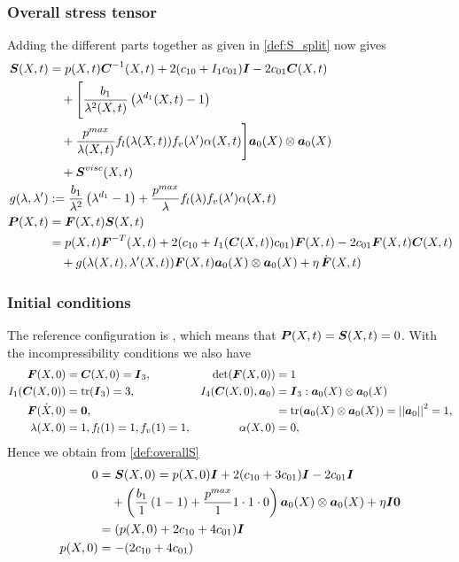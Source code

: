 \subsubsection{Overall stress tensor}
Adding the different parts together as given in \eqref{def:S_split} now gives
\begin{align}
	\boldsymbol{S}(X,t) &= p(X,t)\boldsymbol{C}^{-1}(X,t) + 2(c_{10} + I_1c_{01})\boldsymbol{I} - 2c_{01}\boldsymbol{C}(X,t)\label{def:overallS}\\
			 &\quad+\Biggl[\frac{b_1}{\lambda^2(X,t)}\left(\lambda^{d_1}(X,t) - 1\right)\nonumber\\
			 &\quad+\frac{p^{max}}{\lambda(X,t)}f_l(\lambda(X,t))f_v(\lambda')\alpha(X,t)\Biggr]\boldsymbol{a}_0(X)\otimes\boldsymbol{a}_0(X)\\
			 &\quad+\boldsymbol{S}^{visc}(X,t)\nonumber\\
	g(\lambda,\lambda')&:= \frac{b_1}{\lambda^2}\left(\lambda^{d_1} - 1\right)
		+\frac{p^{max}}{\lambda}f_l(\lambda)f_v(\lambda')\alpha(X,t)\label{def:g}\\			 
	\boldsymbol{P}(X,t) &= \boldsymbol{F}(X,t)\boldsymbol{S}(X,t)\label{def:completeP}\\
			 &= p(X,t)\boldsymbol{F}^{-T}(X,t) + 2(c_{10} + I_1(\boldsymbol{C}(X,t))c_{01})\boldsymbol{F}(X,t) - 2c_{01}\boldsymbol{F}(X,t)\boldsymbol{C}(X,t)\nonumber\\
			 &\quad+g(\lambda(X,t),\lambda'(X,t))\boldsymbol{F}(X,t)\boldsymbol{a}_0(X)\otimes\boldsymbol{a}_0(X)+\eta\,\dot{\boldsymbol{F}}(X,t)\nonumber
\end{align}

\subsubsection{Initial conditions}
The reference configuration is , which means that $\boldsymbol{P}(X,t) = \boldsymbol{S}(X,t) = 0$.
With the incompressibility conditions we also have
\begin{align*}
	\boldsymbol{F}(X,0) &= \boldsymbol{C}(X,0) = \boldsymbol{I}_3, & \det(\boldsymbol{F}(X,0)) &= 1\\
	I_1(\boldsymbol{C}(X,0)) &= \operatorname{tr}(\boldsymbol{I}_3) = 3, & I_4(\boldsymbol{C}(X,0),\boldsymbol{a}_0) & = \boldsymbol{I}_3 : \boldsymbol{a}_0(X)\otimes\boldsymbol{a}_0(X)\\
		\dot{\boldsymbol{F}(X,0)}&=\boldsymbol{0},&&	= \operatorname{tr}(\boldsymbol{a}_0(X)\otimes\boldsymbol{a}_0(X)) = \left|\left|\boldsymbol{a}_0\right|\right|_{}^2 = 1,\\
		\lambda(X,0) &= 1, f_l(1) = 1, f_v(1) = 1, & \alpha(X,0) &= 0,
\end{align*}
Hence we obtain from \eqref{def:overallS}
\begin{align}
	0 &= \boldsymbol{S}(X,0) = p(X,0)\boldsymbol{I} + 2(c_{10} + 3c_{01})\boldsymbol{I} - 2c_{01}\boldsymbol{I}\\
			 &\quad+\left(\frac{b_1}{1}\left(1 - 1\right)+\frac{p^{max}}{1}1\cdot1\cdot0\right)\boldsymbol{a}_0(X)\otimes\boldsymbol{a}_0(X)
			 +\eta\boldsymbol{I}\boldsymbol{0}\nonumber\\
			 & = (p(X,0) + 2c_{10} + 4c_{01})\boldsymbol{I}\\
			 p(X,0) &= -(2c_{10} + 4c_{01})
\end{align}

